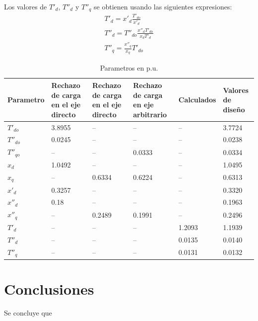 \documentclass[conference]{IEEEtran}
\begin{document}
Los valores de $T'_d$, $T''_d$ y $T''_q$ se obtienen usando las siguientes expresiones:
\begin{gather}
    T'_d = x'_d\frac{T'_{do}}{x'_d}\\
    T''_d = T''_{do}\frac{x''_d T'_{do}}{x_d T'_d} \\
    T''_q = \frac{x''_q}{x_q}  T'_{do}
\end{gather}

\setlength{\extrarowheight}{2pt} %
\begin{table}[ht]
\centering
\caption{Parametros en p.u.}
\setlength{\tabcolsep}{6pt}
\begin{tabular}{C{1cm} C{1cm} C{1cm} C{1cm} C{1cm} C{1.25cm}}
\toprule
\textbf{Parametro} &
\textbf{Rechazo de carga en el eje directo} &
\textbf{Rechazo de carga en el eje directo} &
\textbf{Rechazo de carga en eje arbitrario} &
\textbf{Calculados} & 
\textbf{Valores de diseño} \\
\hline
\midrule
$T'_{do}$ & 3.8955 & --     & --     & --     & 3.7724 \\
$T''_{do}$ & 0.0245 & --     & --     & --     & 0.0238 \\
$T''_{qo}$ & --     & --     & 0.0333 & --     & 0.0334 \\
$x_d$ & 1.0492 & --     & --     & --     & 1.0495 \\
$x_q$ & --     & 0.6334 & 0.6224 & --     & 0.6313 \\
$x'_d$ & 0.3257 & --     & --     & --     & 0.3320 \\
$x''_d$ & 0.18 & --     & --     & --     & 0.1963 \\
$x''_q$ & --     & 0.2489 & 0.1991 & --     & 0.2496 \\
$T'_d$ & --     & --     & --     & 1.2093 & 1.1939 \\
$T''_d$ & --     & --     & --     & 0.0135 & 0.0140 \\
$T''_q$ & --     & --     & --     & 0.0131 & 0.0132 \\
\bottomrule
\end{tabular}
\label{tab:result}
\end{table}


\section{Conclusiones}
Se concluye que 
\end{document}
